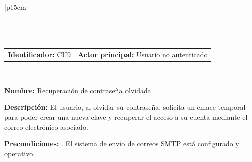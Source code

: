 \begingroup
{}
\setlength{\arrayrulewidth}{1pt}
\begin{longtable}{|p{15cm}|}
  \hline
   \\
  \hline
  \endfirsthead
   \\
  \hline
   \\
  \hline
  \endhead
  \hline {} \\ \hline
  \endfoot
  \hline
  \caption{Caso de Uso CU9 — Recuperación de contraseña olvidada.}
  \label{TB:CU9_RECUPERAR_PASSWORD}
  \endlastfoot

  \begin{tabularx}{\linewidth}{@{}X X@{}}
    \textbf{Identificador:} CU9 & \textbf{Actor principal:} Usuario no autenticado
  \end{tabularx} \\ \hline

  \textbf{Nombre:} Recuperación de contraseña olvidada \\ \hline

  \textbf{Descripción:} \newline 
  El usuario, al olvidar su contraseña, solicita un enlace temporal para poder crear una nueva clave y recuperar el acceso a su cuenta mediante el correo electrónico asociado. \\ \hline

  \textbf{Precondiciones:} . El sistema de envío de correos SMTP está configurado y operativo. \\ \hline


\end{longtable}

